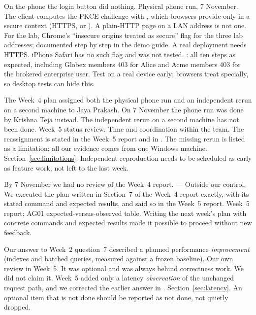 {On the phone the login button did nothing.}
{Physical phone run, 7 November.}
{The client computes the PKCE challenge with , which browsers provide only in a secure context (HTTPS,  or ). A plain-HTTP page on a LAN address is not one.}
{For the lab, Chrome's ``insecure origins treated as secure'' flag for the three lab addresses; documented step by step in the demo guide. A real deployment needs HTTPS. iPhone Safari has no such flag and was not tested.}
{: all ten steps as expected, including Globex members 403 for Alice and Acme members 403 for the brokered enterprise user.}
{Test on a real device early; browsers treat  specially, so desktop tests can hide this.}

{The Week~4 plan assigned both the physical phone run and an independent rerun on a second machine to Jaya Prakash. On 7 November the phone run was done by Krishna Teja instead. The independent rerun on a second machine has not been done.}
{Week~5 status review.}
{Time and coordination within the team.}
{The reassignment is stated in the Week~5 report and in . The missing rerun is listed as a limitation; all our evidence comes from one Windows machine.}
{Section~\ref{sec:limitations}.}
{Independent reproduction needs to be scheduled as early as feature work, not left to the last week.}

{By 7 November we had no review of the Week~4 report.}
{---}
{Outside our control.}
{We executed the plan written in Section~7 of the Week~4 report exactly, with its stated command and expected results, and said so in the Week~5 report.}
{Week~5 report; AG01 expected-versus-observed table.}
{Writing the next week's plan with concrete commands and expected results made it possible to proceed without new feedback.}

{Our answer to Week~2 question~7 described a planned performance \emph{improvement} (indexes and batched queries, measured against a frozen baseline).}
{Our own review in Week~5.}
{It was optional and was always behind correctness work.}
{We did not claim it. Week~5 added only a latency \emph{observation} of the unchanged request path, and we corrected the earlier answer in .}
{Section~\ref{sec:latency}.}
{An optional item that is not done should be reported as not done, not quietly dropped.}

